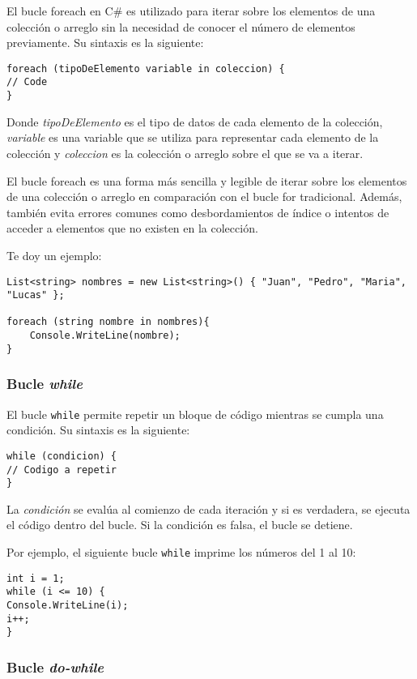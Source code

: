\documentclass[executivepaper]{article}
\begin{document}
El bucle foreach en C\# es utilizado para iterar sobre los elementos de una colección o arreglo sin la necesidad de conocer el número de elementos previamente. Su sintaxis es la siguiente:

\begin{lstlisting}
foreach (tipoDeElemento variable in coleccion) {
// Code
}
\end{lstlisting}

Donde \emph{tipoDeElemento} es el tipo de datos de cada elemento de la colección, \emph{variable} es una variable que se utiliza para representar cada elemento de la colección y \emph{coleccion} es la colección o arreglo sobre el que se va a iterar.

El bucle foreach es una forma más sencilla y legible de iterar sobre los elementos de una colección o arreglo en comparación con el bucle for tradicional. Además, también evita errores comunes como desbordamientos de índice o intentos de acceder a elementos que no existen en la colección.

Te doy un ejemplo:
\begin{lstlisting}
List<string> nombres = new List<string>() { "Juan", "Pedro", "Maria", "Lucas" };

foreach (string nombre in nombres){
    Console.WriteLine(nombre);
}
\end{lstlisting}

\subsubsection*{Bucle \emph{while}}

El bucle \verb|while| permite repetir un bloque de código mientras se cumpla una condición. Su sintaxis es la siguiente:

\begin{lstlisting}
while (condicion) {
// Codigo a repetir
}
\end{lstlisting}

La \emph{condición} se evalúa al comienzo de cada iteración y si es verdadera, se ejecuta el código dentro del bucle. Si la condición es falsa, el bucle se detiene.

Por ejemplo, el siguiente bucle \verb|while| imprime los números del 1 al 10:

\begin{lstlisting}
int i = 1;
while (i <= 10) {
Console.WriteLine(i);
i++;
}
\end{lstlisting}

\subsubsection*{Bucle \emph{do-while}}
\end{document}

